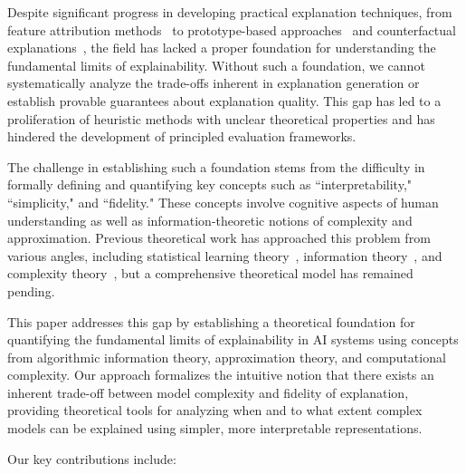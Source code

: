 \documentclass[11pt,letter,leqno]{article}
\begin{document}
Despite significant progress in developing practical explanation techniques, from feature attribution methods~\cite{Lundberg2017, Ribeiro2016} to prototype-based approaches~\cite{Chen2019} and counterfactual explanations~\cite{Wachter2017}, the field has lacked a proper foundation for understanding the fundamental limits of explainability.  Without such a foundation, we cannot systematically analyze the trade-offs inherent in explanation generation or establish provable guarantees about explanation quality.  This gap has led to a proliferation of heuristic methods with unclear theoretical properties and has hindered the development of principled evaluation frameworks.

The challenge in establishing such a foundation stems from the difficulty in formally defining and quantifying key concepts such as ``interpretability," ``simplicity," and ``fidelity."  These concepts involve cognitive aspects of human understanding as well as information-theoretic notions of complexity and approximation.  Previous theoretical work has approached this problem from various angles, including statistical learning theory~\cite{Ruping2006}, information theory~\cite{Zhou2021}, and complexity theory~\cite{Herman2017}, but a comprehensive theoretical model has remained pending.

This paper addresses this gap by establishing a theoretical foundation for quantifying the fundamental limits of explainability in AI systems using concepts from algorithmic information theory, approximation theory, and computational complexity.  Our approach formalizes the intuitive notion that there exists an inherent trade-off between model complexity and fidelity of explanation, providing theoretical tools for analyzing when and to what extent complex models can be explained using simpler, more interpretable representations.

Our key contributions include:
\end{document}
